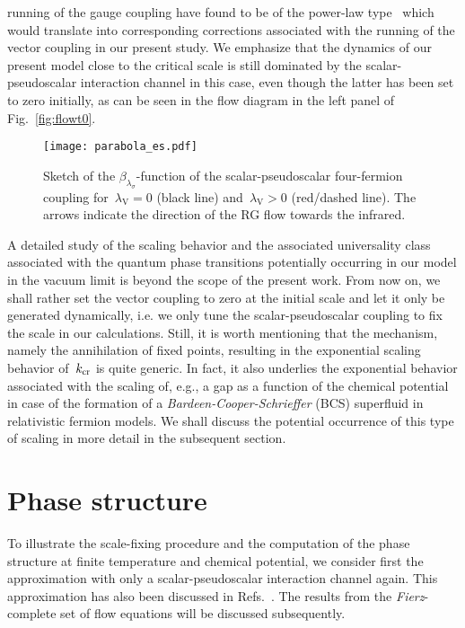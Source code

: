 \documentclass[prd,english,preprintnumbers,amsmath,amssymb,nofootinbib,twocolumn,superscriptaddress]{revtex4-1}
\begin{document}
{running of the gauge coupling have found to be of the power-law type~\cite{Braun:2010qs} 
which would translate into corresponding corrections associated with the running of the 
vector coupling in our present study. We emphasize that the dynamics of our present model close to the critical scale is still dominated by the
scalar-pseudoscalar interaction channel in this case, even though the latter has been set to zero initially, 
as can be seen in the flow diagram in the left panel of Fig.~\ref{fig:flowt0}.
%
\begin{figure}[t]
\begin{center}
  \texttt{[image: parabola\_es.pdf]}
\end{center}
\caption{Sketch of the $\beta_{\lambda_{\sigma}}$-function of the scalar-pseudoscalar four-fermion coupling for~$\lambda_{\text{V}} = 0$ 
(black line) and~$\lambda_{\text{V}}>0$ (red/dashed
line). The arrows indicate the direction of the RG flow towards the infrared.
}
\label{fig:es}
\end{figure}
%

A detailed study of the scaling behavior and the associated universality class associated with the quantum phase transitions
potentially occurring in our model in the vacuum limit is beyond the scope of the present work. From now on, we shall rather 
set the vector coupling to zero at the initial scale and let it only be generated dynamically, i.e. we only tune the scalar-pseudoscalar coupling
to fix the scale in our calculations. Still, it is worth mentioning that the mechanism, namely the 
annihilation of fixed points, resulting in
the exponential scaling behavior of~$k_{\rm cr}$ is quite generic. In fact, it also underlies the exponential behavior associated
with the scaling of, e.g., a gap as a function of the chemical potential in case of 
the formation of a {\it Bardeen-Cooper-Schrieffer} (BCS) superfluid in relativistic fermion models. 
We shall discuss the potential occurrence of this type of scaling in more detail in the subsequent section.

%
\section{Phase structure}\label{sec:ps}
%

To illustrate the scale-fixing procedure and the computation of
the phase structure at finite temperature and chemical potential, we consider first the approximation with
only a scalar-pseudoscalar interaction channel again. This approximation has also been 
discussed in Refs.~\cite{Braun:2011pp,Aoki:2015hsa}. The results from the 
{\it Fierz}-complete set of flow equations will be discussed subsequently. 

}
\end{document}
